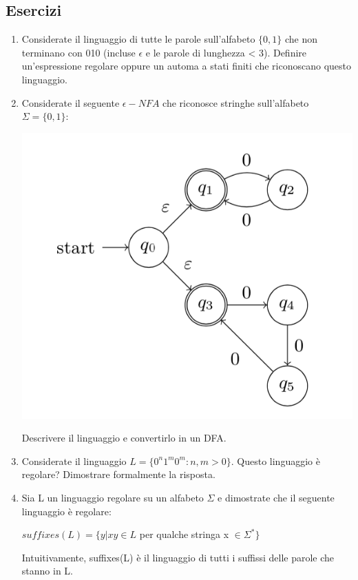 \documentclass[a4paper,11pt]{article}
\begin{document}
\subsection{Esercizi}
\begin{enumerate}
    \item Considerate il linguaggio di tutte le parole sull’alfabeto $\{0,1\}$ che non terminano con 010 (incluse $\epsilon$ e le parole di lunghezza < 3). Definire un’espressione regolare oppure un automa a stati finiti che riconoscano questo linguaggio.
    \item Considerate il seguente $\epsilon-NFA$ che riconosce stringhe sull’alfabeto $\Sigma = \{0, 1\}$:
   \begin{center}
        \includegraphics[scale=0.6]{0507182.png}
    \end{center}
    Descrivere il linguaggio e convertirlo in un DFA.
    \item Considerate il linguaggio $L = \{0^n 1^m 0^m : n, m > 0\}$. Questo linguaggio è regolare? Dimostrare formalmente la risposta.
\item Sia L un linguaggio regolare su un alfabeto $\Sigma$ e dimostrate che il seguente linguaggio è regolare: \\ \begin{center}
$suffixes(L) = \{y | xy \in L $ per qualche stringa x $ \in \Sigma ^*\}$ \end{center}
    Intuitivamente, suffixes(L) è il linguaggio di tutti i suffissi delle parole che stanno in L.

\end{enumerate}
\end{document}
